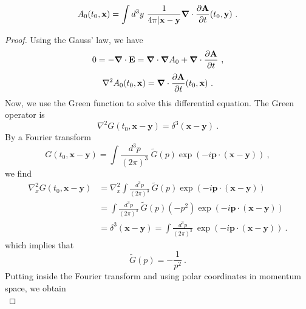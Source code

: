     \begin{equation*}
        A_0 (t_0, \mathbf x) = \int d^3 y ~ \frac{1}{4\pi |\mathbf x - \mathbf y} \boldsymbol \nabla \cdot \frac{\partial\mathbf A}{\partial t} (t_0, \mathbf y)  ~.
    \end{equation*}
    \begin{proof}
        Using the Gauss' law, we have 
        \begin{equation*}
            0 = - \boldsymbol \nabla \cdot \mathbf E = \boldsymbol \nabla \cdot \boldsymbol \nabla A_0 + \boldsymbol \nabla \cdot \frac{\partial\mathbf A}{\partial t} ~,
        \end{equation*}
        \begin{equation*}
            \nabla^2 A_0 (t_0, \mathbf x) = \boldsymbol \nabla \cdot \frac{\partial\mathbf A}{\partial t} (t_0, \mathbf x) ~.
        \end{equation*}
        Now, we use the Green function to solve this differential equation. The Green operator is 
        \begin{equation*}
            \nabla^2 G (t_0, \mathbf x - \mathbf y) = \delta^3 (\mathbf x - \mathbf y) ~.
        \end{equation*}
        By a Fourier transform 
        \begin{equation*}
            G (t_0, \mathbf x - \mathbf y) = \int \frac{d^3 p}{(2\pi)^3} ~ \tilde G (p) \exp(- i \mathbf p \cdot (\mathbf x - \mathbf y)) ~,
        \end{equation*}
        we find 
        \begin{equation*}
        \begin{aligned}
            \nabla^2_x G (t_0, \mathbf x - \mathbf y) & = \nabla^2_x \int \frac{d^3 p}{(2\pi)^3} ~ \tilde G (p) \exp(- i \mathbf p \cdot (\mathbf x - \mathbf y)) \\ &= \int \frac{d^3 p}{(2\pi)^3} ~ \tilde G (p) (- p^2) \exp(- i \mathbf p \cdot (\mathbf x - \mathbf y)) \\ & = \delta^3 (\mathbf x - \mathbf y) = \int \frac{d^3 p}{(2\pi)^3} ~ \exp(- i \mathbf p \cdot (\mathbf x - \mathbf y)) ~.
        \end{aligned}
        \end{equation*}
        which implies that 
        \begin{equation*}
            \tilde G (p) = - \frac{1}{p^2} ~.
        \end{equation*}
        Putting inside the Fourier transform and using polar coordinates in momentum space, we obtain 
        \begin{equation*}

\end{equation*}
\end{proof}
